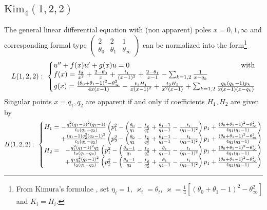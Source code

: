 \documentclass[12]{amsart}
\begin{document}
\subsection{$\mathrm{Kim}_4(1,2,2)$}
The general linear differential equation with (non apparent) poles $x=0,1,\infty$
and corresponding formal type $\begin{pmatrix}2&2&1\\ \theta_0&\theta_1&\theta_\infty\end{pmatrix}$ can be normalized into the form\footnote{From Kimura's formulae \cite{Kimura}, set $\eta_i=1$, 
$\varkappa_i=\theta_i$, $\varkappa=\frac{1}{4}\left[ (\theta_0+\theta_1-1)^2-\theta_\infty^2\right]$
and $K_i=H_i$.}
\begin{equation}\label{eq:Lin(1,2,2)}
L(1,2,2):\ \left\{\begin{matrix}u''+f(x)u'+g(x)u=0\ \ \ \hfill\text{with}\\
f(x)=\frac{t_2}{x^2}+\frac{2-\theta_0}{x}+\frac{t_1}{(x-1)^2}+\frac{2-\theta_1}{x-1}-\sum_{k=1,2}\frac{1}{x-q_k}\hfill\hfill\\
g(x)=\frac{(\theta_0+\theta_1-1)^2-\theta_\infty^2}{4x(x-1)}-\frac{t_1H_1}{x(x-1)^2}+\frac{t_2H_2}{x^2(x-1)}+\sum_{k=1,2}\frac{q_k(q_k-1)p_k}{x(x-1)(x-q_k)}
\end{matrix}\right.
\end{equation}
Singular points $x=q_1,q_2$ are apparent if and only if coefficients $H_1,H_2$ are given by
\begin{equation}\label{eq:Ham(1,2,2)}
H(1,2,2):\ \left\{\begin{matrix}
H_1=\hfill-\frac{q_1^2(q_1-1)^2(q_2-1)}{t_1(q_1-q_2)}
\left(p_1^2-\left(\frac{\theta_0}{q_1}-\frac{t_2}{q_1^2}+\frac{\theta_1-1}{q_1-1}-\frac{t_1}{(q_1-1)^2}\right)p_1+\frac{(\theta_0+\theta_1-1)^2-\theta_\infty^2}{4q_1(q_1-1)}\right)\\
\hfill+\frac{(q_1-1)q_2^2(q_2-1)^2}{t_1(q_1-q_2)}
\left(p_2^2-\left(\frac{\theta_0}{q_2}-\frac{t_2}{q_2^2}+\frac{\theta_1-1}{q_2-1}-\frac{t_1}{(q_2-1)^2}\right)p_1+\frac{(\theta_0+\theta_1-1)^2-\theta_\infty^2}{4q_2(q_2-1)}\right)\\
H_2=\hfill-\frac{q_1^2(q_1-1)^2q_2}{t_2(q_1-q_2)}
\left(p_1^2-\left(\frac{\theta_0-1}{q_1}-\frac{t_2}{q_1^2}+\frac{\theta_1}{q_1-1}-\frac{t_1}{(q_1-1)^2}\right)p_1+\frac{(\theta_0+\theta_1-1)^2-\theta_\infty^2}{4q_1(q_1-1)}\right)\\
\hfill+\frac{q_1q_2^2(q_2-1)^2}{t_2(q_1-q_2)}
\left(p_2^2-\left(\frac{\theta_0-1}{q_2}-\frac{t_2}{q_2^2}+\frac{\theta_1}{q_2-1}-\frac{t_1}{(q_2-1)^2}\right)p_1+\frac{(\theta_0+\theta_1-1)^2-\theta_\infty^2}{4q_2(q_2-1)}\right)
\end{matrix}\right.
\end{equation}
\end{document}
